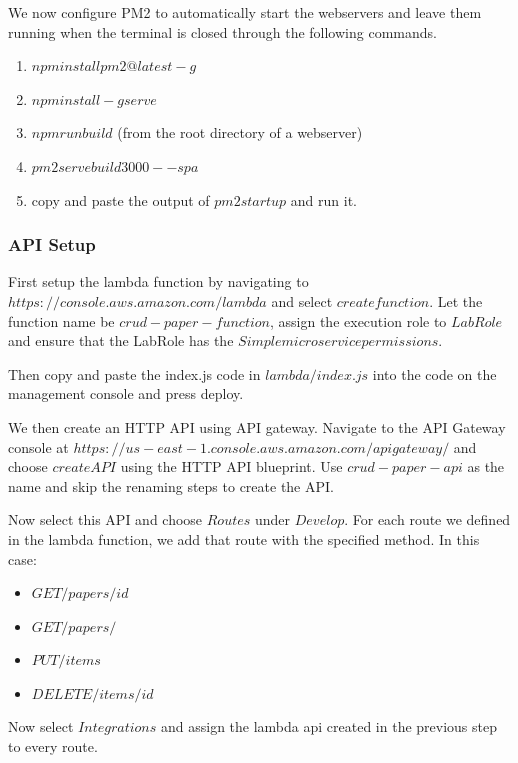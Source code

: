 \documentclass[12pt]{article}
\begin{document}
We now configure PM2 to automatically start the webservers and leave them running when the terminal is closed through the following commands.

\begin{enumerate}
    \item $npm install pm2@latest -g$
    \item $npm install -g serve$
    \item $npm run build$ (from the root directory of a webserver)
    \item $pm2 serve build 3000 --spa$
    \item copy and paste the output of $pm2 startup$ and run it.

\end{enumerate}
    
\subsubsection{API Setup}

First setup the lambda function by navigating to $https://console.aws.amazon.com/lambda$ and select $create function$. Let the function name be $crud-paper-function$, assign the execution role to $LabRole$ and ensure that the LabRole has the $Simple microservice permissions$.

Then copy and paste the index.js code in $lambda/index.js$ into the code on the management console and press deploy.

We then create an HTTP API using API gateway. Navigate to the API Gateway console at $https://us-east-1.console.aws.amazon.com/apigateway/$ and choose $create API$ using the HTTP API blueprint. Use $crud-paper-api$ as the name and skip the renaming steps to create the API. 

Now select this API and choose $Routes$ under $Develop$. For each route we defined in the lambda function, we add that route with the specified method. In this case: 

\begin{itemize}
    \item $GET /papers/{id} $
    \item $GET /papers/$
    \item $PUT /items$
    \item $DELETE /items/{id}$
\end{itemize}

Now select $Integrations$ and assign the lambda api created in the previous step to every route.
\end{document}
